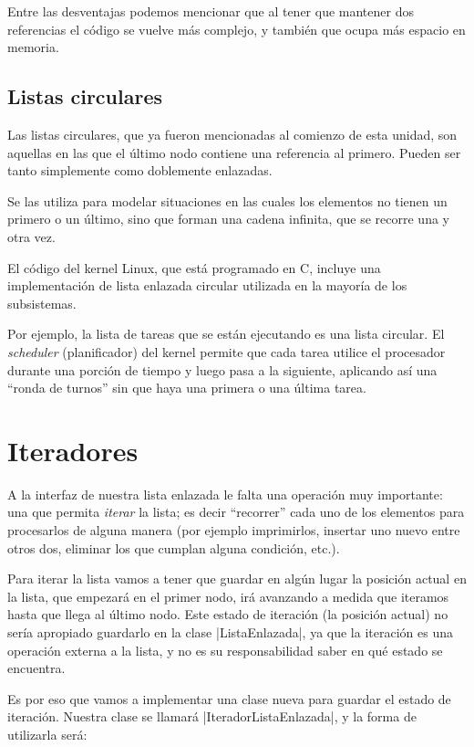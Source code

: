 Entre las desventajas podemos mencionar que al tener que mantener dos
referencias el código se vuelve más complejo, y también que ocupa más
espacio en memoria.

\subsection*{Listas circulares}

Las listas circulares, que ya fueron mencionadas al comienzo de esta
unidad, son aquellas en las que el último nodo contiene una referencia al
primero.  Pueden ser tanto simplemente como doblemente enlazadas.

Se las utiliza para modelar situaciones en las cuales los elementos no
tienen un primero o un último, sino que forman una cadena infinita, que se
recorre una y otra vez.

\begin{sabias_que}
El código del kernel Linux, que está programado en C, incluye una
implementación de lista enlazada circular utilizada en la mayoría de los
subsistemas.

Por ejemplo, la lista de tareas que se están ejecutando es una lista
circular.  El \emph{scheduler} (planificador) del kernel permite que cada tarea
utilice el procesador durante una porción de tiempo y luego pasa a la
siguiente, aplicando así una ``ronda de turnos'' sin que haya una primera o una
última tarea.
\end{sabias_que}

\section{Iteradores}

A la interfaz de nuestra lista enlazada le falta una operación muy importante:
una que permita \emph{iterar} la lista; es decir ``recorrer'' cada uno de los
elementos para procesarlos de alguna manera (por ejemplo imprimirlos, insertar
uno nuevo entre otros dos, eliminar los que cumplan alguna condición, etc.).

Para iterar la lista vamos a tener que guardar en algún lugar la posición
actual en la lista, que empezará en el primer nodo, irá avanzando a medida que
iteramos hasta que llega al último nodo. Este estado de iteración (la posición
actual) no sería apropiado guardarlo en la clase |ListaEnlazada|, ya que la
iteración es una operación externa a la lista, y no es su responsabilidad saber
en qué estado se encuentra.

Es por eso que vamos a implementar una clase nueva para guardar el estado de
iteración. Nuestra clase se llamará |IteradorListaEnlazada|, y la forma de
utilizarla será:

